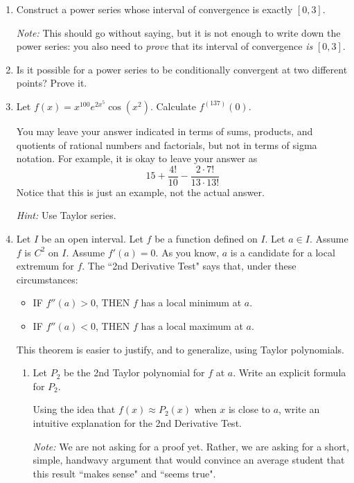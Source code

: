 \documentclass[12pt]{exam}
\newcommand {\DS} [1] {${\displaystyle #1}$}
\begin{document}
\begin{enumerate}

\item Construct a power series whose interval of convergence is exactly \DS{[0,3]}. 

\emph{Note:}  This should go without saying, but it is not enough to write down the power series: you also need to \emph{prove} that its interval of convergence \emph{is} \DS{[0,3].}

\item Is it possible for a power series to be conditionally convergent at two different points?  Prove it.

\item Let \DS{f(x) = x^{100} e^{2x^5} \cos ( x^2) }.  Calculate \DS{f^{(137)}(0)}.   

You may leave your answer indicated in terms of sums, products, and quotients of rational numbers and factorials, but not in terms of sigma notation.  For example, it is okay to leave your answer as
	$$
		 15 + \frac{4!}{10} - \frac{2 \cdot 7!}{13 \cdot 13!}
	$$ 
Notice that this is just an example, not the actual answer.	

\emph{Hint:}  Use Taylor series.  


\item  Let $I$ be an open interval.    Let $f$ be a function defined on $I$.  Let $a \in I$.  Assume $f$ is $C^2$ on $I$.   Assume $f'(a) = 0$.   As you know, $a$ is a candidate for a local extremum for $f$.  The ``2nd Derivative Test" says that, under these circumstances:
	\begin{itemize}
		\item  IF $f''(a)>0$, THEN $f$ has a local minimum at $a$.
		\item  IF $f''(a)<0$, THEN $f$ has a local maximum at $a$.
	\end{itemize}
	 This theorem is easier to justify, and to generalize, using Taylor polynomials.
	\begin{enumerate}
		\item  \label{qu:int} Let $P_2$ be the 2nd Taylor polynomial for $f$ at $a$.  Write an explicit formula for $P_2$.
		
			Using the idea that $f(x) \approx P_2(x)$ when $x$ is close to $a$, write an intuitive explanation for the 2nd Derivative Test.  
			
			\emph{Note:}  We are not asking for a proof yet.  Rather, we are asking for a short, simple, handwavy argument that would convince an average student that this result ``makes sense" and ``seems true".
			

\end{enumerate}
\end{enumerate}
\end{document}
